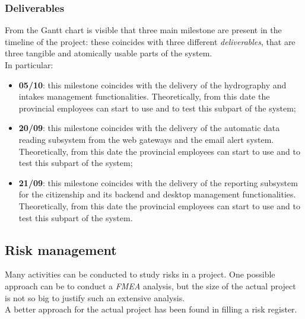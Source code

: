 \subsubsection{Deliverables}
From the Gantt chart is visible that three main milestone are present in the timeline of the project: these coincides with three different \textit{deliverables}, that are three tangible and atomically usable parts of the system.\\
In particular:
\begin{itemize}
    \item \textbf{05/10}: this milestone coincides with the delivery of the hydrography and intakes management functionalities. Theoretically, from this date the provincial employees can start to use and to test this subpart of the system;
    \item \textbf{20/09}: this milestone coincides with the delivery of the automatic data reading subsystem from the web gateways and the email alert system. Theoretically, from this date the provincial employees can start to use and to test this subpart of the system;
    \item \textbf{21/09}: this milestone coincides with the delivery of the reporting subsystem for the citizenship and its backend and desktop management functionalities. Theoretically, from this date the provincial employees can start to use and to test this subpart of the system.
\end{itemize}

\pagebreak
\subsection{Risk management}
Many activities can be conducted to study risks in a project. One possible approach can be to conduct a \textit{FMEA} analysis, but the size of the actual project is not so big to justify such an extensive analysis. \\
A better approach for the actual project has been found in filling a risk register.

